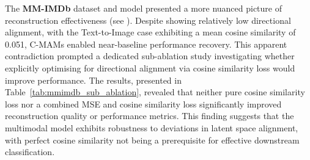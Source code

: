 The \textbf{MM-IMDb} dataset and model presented a more nuanced picture of reconstruction effectiveness (see ). Despite showing relatively low directional alignment, with the Text-to-Image case exhibiting a mean cosine similarity of 0.051, C-MAMs enabled near-baseline performance recovery. This apparent contradiction prompted a dedicated sub-ablation study investigating whether explicitly optimising for directional alignment via cosine similarity loss would improve performance. The results, presented in Table~\ref{tab:mmimdb_sub_ablation}, revealed that neither pure cosine similarity loss nor a combined MSE and cosine similarity loss significantly improved reconstruction quality or performance metrics. This finding suggests that the multimodal model exhibits robustness to deviations in latent space alignment, with perfect cosine similarity not being a prerequisite for effective downstream classification.

\begin{table}[tb]
    \centering
    \caption{analysis of how varying the cosine loss term influences model performance metrics and embedding reconstruction in the MM-IMDb multimodal dataset.}
    \label{tab:mmimdb_sub_ablation}
\end{table}

